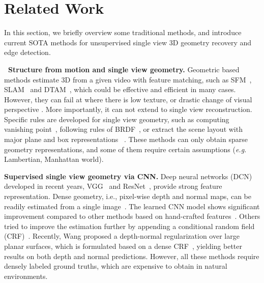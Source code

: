 
\vspace{-0.5\baselineskip}
\section{Related Work}
\vspace{-0.5\baselineskip}
\label{sec:related}
In this section, we briefly overview some traditional methods, and introduce current SOTA methods for unsupervised single view 3D geometry recovery and edge detection. 

\textbf{~Structure from motion and single view geometry.}
Geometric based methods estimate 3D from a given video with feature matching, such as SFM~\cite{wu2011visualsfm}, SLAM~\cite{mur2015orb,engel2014lsd} and DTAM~\cite{NewcombeLD11}, which could be effective and efficient in many cases. 
However, they can fail at where there is low texture, or drastic change of visual perspective \etc. More importantly, it can not extend to single view reconstruction.
Specific rules are developed for single view geometry, such as computing vanishing point~\cite{HoiemEH07}, following rules of BRDF~\cite{prados2006shape,kong2015intrinsic}, or extract the scene layout with major plane and box representations~\cite{DBLP:conf/iccv/SchwingFPU13,DBLP:conf/3dim/SrajerSPP14} \etc. These methods can only obtain sparse geometry representations, and some of them require certain assumptions (\textit{e.g.} Lambertian, Manhattan world).

\textbf{Supervised single view geometry via CNN.}
Deep neural networks (DCN) developed in recent years, \eg VGG~\cite{simonyan2014very} and ResNet~\cite{laina2016deeper}, provide strong feature representation. Dense geometry, i.e., pixel-wise depth and normal maps, can be readily estimated from a single image~\cite{wang2015designing,eigen2015predicting,laina2016deeper,li2017two,chuang2018cvpr}. The learned CNN model shows significant improvement compared to other methods based on hand-crafted features~\cite{karsch2014depth,ladicky2014pulling,zeisl2014discriminatively}. Others tried to improve the estimation further by appending a conditional random field (CRF)~\cite{DBLP:conf/cvpr/WangSLCPY15,Liu_2015_CVPR,li2015depth}. Recently, Wang \etal \cite{peng2016depth} proposed a depth-normal regularization over large planar surfaces, which is formulated based on a dense CRF~\cite{DBLP:journals/corr/abs-1210-5644}, yielding better results on both depth and normal predictions. However, all these methods require densely labeled ground truths, which are expensive to obtain in natural environments.

